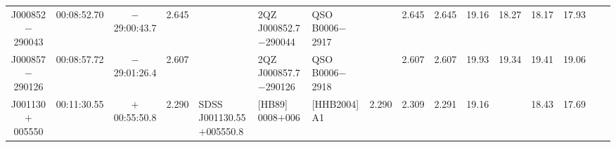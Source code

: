 {\begin{tabular}{cccclllccccccccc}
  J000852$-$290043 & 00:08:52.70 & $-$29:00:43.7 & 2.645 &                            & 2QZ J000852.7$-$290044     & QSO B0006$-$2917           &       & 2.645 & 2.645 & 19.16 & 18.27 & 18.17 & 17.93 \\
  J000857$-$290126 & 00:08:57.72 & $-$29:01:26.4 & 2.607 &                            & 2QZ J000857.7$-$290126     & QSO B0006$-$2918           &       & 2.607 & 2.607 & 19.93 & 19.34 & 19.41 & 19.06 \\
  J001130$+$005550 & 00:11:30.55 & $+$00:55:50.8 & 2.290 & SDSS J001130.55$+$005550.8 & [HB89] 0008$+$006          & [HHB2004] A1               & 2.290 & 2.309 & 2.291 & 19.16 &       & 18.43 & 17.69 \\
\hline
\end{tabular}

\bigskip

}
